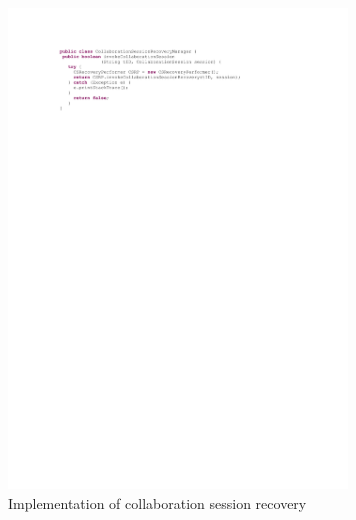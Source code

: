 \documentclass[conference]{IEEEtran}
\begin{document}
\begin{figure}[htb] %
\centering
\includegraphics[width=9cm,keepaspectratio]{csrecovery}
\caption{Implementation of collaboration session recovery}
\label{fig:csrecovery}
\end{figure}
\end{document}
